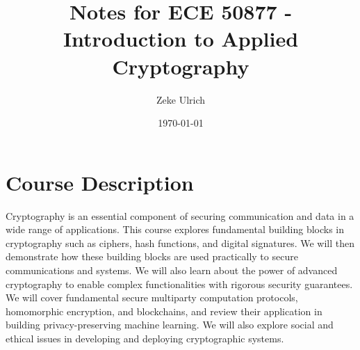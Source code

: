 \documentclass[nobib]{tufte-handout}
\title{Notes for ECE 50877 - Introduction to Applied Cryptography }
\author{Zeke Ulrich}
\date{\today}
\begin{document}
\maketitle

\tableofcontents

\section{Course Description}
Cryptography is an essential component of securing communication and data in a wide range of applications. This course explores fundamental building blocks in cryptography such as ciphers, hash functions, and digital signatures. We will then demonstrate how these building blocks are used practically to secure communications and systems. We will also learn about the power of advanced cryptography to enable complex functionalities with rigorous security guarantees. We will cover fundamental secure multiparty computation protocols, homomorphic encryption, and blockchains, and review their application in building privacy-preserving machine learning. We will also explore social and ethical issues in developing and deploying cryptographic systems.
\pagebreak























\end{document}
